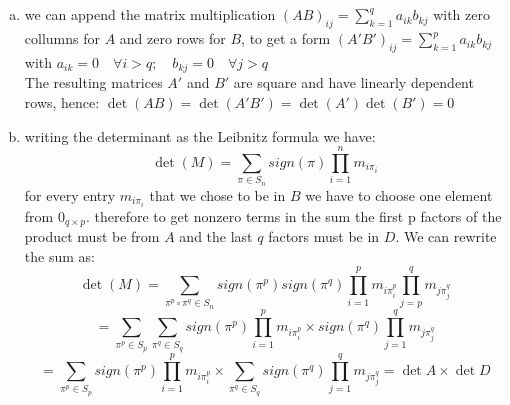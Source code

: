 \documentclass[a4paper,10pt]{article}
\begin{document}
\subsection{}
\label{sub:two}
\begin{enumerate}[(a)]
	\item we can append the matrix multiplication  $ (AB)_{ij}=\sum\limits_{k=1}^{q} a_{ik}b_{kj}$
		with zero collumns for $A$ and zero rows for $B$, to get a form   $ (A'B')_{ij}= \sum\limits_{k=1}^{p} a_{ik}b_{kj}$ with $ 
		a_{ik}=0\quad\forall i>q;\quad b_{kj}=0\quad\forall j>q$ \\
		The resulting matrices $A'$ and $B'$ are square and have linearly dependent rows, hence: $ \det(AB)=\det(A'B')=\det(A')\det(B')=0$
	\item writing the determinant as the Leibnitz formula we have:
		\begin{equation*}
			\det (M)=\sum_{\pi \in S_n} sign(\pi) \prod_{i=1}^{n}m_{i\pi_i} 
		\end{equation*}
		for every entry $m_{i\pi_i}$ that we chose to be in $B$ we have to choose one element from $0_{q\times p}.$ therefore to get nonzero terms in the sum the first p factors  of the product must be from $A$ and the last $q$ factors must be in $D$. We can rewrite the sum as:
		\begin{equation*}
			\det(M)= \sum_{\pi^p\circ\pi^q \in S_n} sign (\pi^p) sign(\pi^q) \prod_{i=1}^{p}m_{i\pi_i^p}\prod_{j=p}^{q}m_{j\pi_j^q}
		\end{equation*}
		\begin{equation*}
			= \sum_{\pi^p\in S_p}\sum_{\pi^q\in S_q}sign(\pi^p) \prod_{i=1}^{p}m_{i\pi_i^p}\times sign(\pi^q)\prod_{j=1}^{q}m_{j\pi_j^q}	
		\end{equation*}
		\begin{equation*}
			= \sum_{\pi^p\in S_p}sign(\pi^p) \prod_{i=1}^{p}m_{i\pi_i^p}\times \sum_{\pi^q\in S_q}sign(\pi^q)\prod_{j=1}^{q}m_{j\pi_j^q}= \det A \times \det D	
		\end{equation*}
\end{enumerate}
\end{document}
